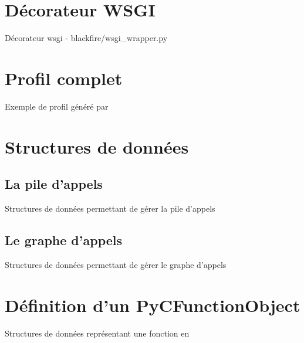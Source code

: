 

\chapter{Décorateur WSGI}
  \label{app:decorateurwsgi}
  \begin{listing}[H]
    \caption{Décorateur wsgi - blackfire/wsgi\_wrapper.py}
  \end{listing}
 
\chapter{Profil complet}
  \label{app:fullProfile}
  \vspace{-20px}
  \vspace{-20px}
  \begin{listing}[H]
    \caption{Exemple de profil généré par \Blackfire}
  \end{listing}
 
\chapter{Structures de données}
  \section{La pile d'appels}
    \label{app:pile_struct}
    \begin{listing}[H]
      \caption{Structures de données permettant de gérer la pile d'appels}
    \end{listing}
  \section{Le graphe d'appels}
    \label{app:graph_struct}
    \begin{listing}[H]
      \caption{Structures de données permettant de gérer le graphe d'appels}
    \end{listing}
 
\chapter{Définition d'un PyCFunctionObject}
  \label{app:PyCFunctionObject}
  \begin{listing}[H]
    \caption{Structures de données représentant une fonction \C en \Python}
  \end{listing}
 
